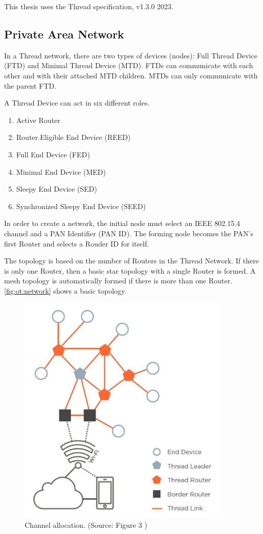 This thesis uses the Thread specification, v1.3.0 2023.

\subsection{Private Area Network}
\label{sec:ot:pan}
In a Thread network, there are two types of devices (nodes): Full Thread Device (FTD) and Minimal Thread Device (MTD). FTDs can communicate with each other and with their attached MTD children. MTDs can only communicate with the parent FTD.

A Thread Device can act in six different roles.
\begin{enumerate}
    \item Active Router
    \item Router.Eligible End Device (REED)
    \item Full End Device (FED)
    \item Minimal End Device (MED)
    \item Sleepy End Device (SED)
    \item Synchronized Sleepy End Device (SEED)
\end{enumerate}

In order to create a network, the initial node must select an IEEE 802.15.4 channel and
a PAN Identifier (PAN ID).
The forming node becomes the PAN's first Router and selects a Rouder ID for itself.

The topology is based on the number of Routers in the Thread Network.
If there is only one Router, then a basic star topology with a single Router is formed.
A mesh topology is automatically formed if there is more than one Router.
\autoref{fig:ot:network} shows a basic topology.

\begin{figure}[!ht]
    \centering
    \includegraphics[width=100mm, keepaspectratio]{figures/thread-topology-ThreadNetworkFundamentals_633_4.jpg}
    \caption{Channel allocation. (Source: Figure 3 \cite{thread:nfwp})}
    \label{fig:ot:network}
\end{figure}

